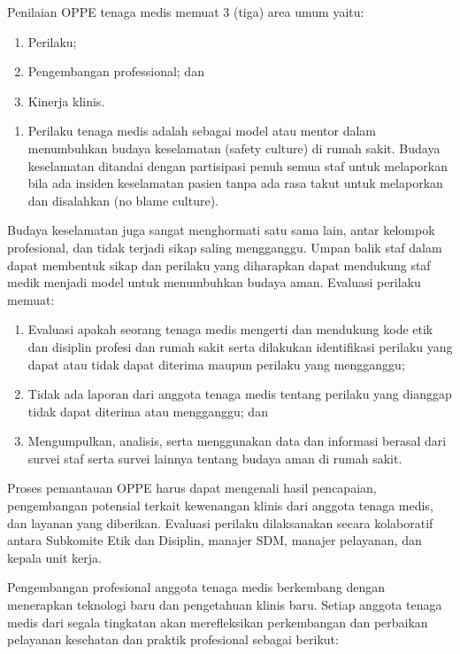 \documentclass[
]{book}
\providecommand{\tightlist}{%
  \setlength{\itemsep}{0pt}\setlength{\parskip}{0pt}}
\begin{document}
Penilaian OPPE tenaga medis memuat 3 (tiga) area umum yaitu:

\begin{enumerate}
\def\labelenumi{\arabic{enumi}.}
\tightlist
\item
  Perilaku;
\item
  Pengembangan professional; dan
\item
  Kinerja klinis.
\end{enumerate}

\begin{enumerate}
\def\labelenumi{\alph{enumi}.}
\setcounter{enumi}{1}
\tightlist
\item
  Perilaku tenaga medis adalah sebagai model atau mentor dalam menumbuhkan budaya keselamatan (safety culture) di rumah sakit. Budaya keselamatan ditandai dengan partisipasi penuh semua staf untuk melaporkan bila ada insiden keselamatan pasien tanpa ada rasa takut untuk melaporkan dan disalahkan (no blame culture).
\end{enumerate}

Budaya keselamatan juga sangat menghormati satu sama lain, antar kelompok profesional, dan tidak terjadi sikap saling mengganggu. Umpan balik staf dalam dapat membentuk sikap dan perilaku yang diharapkan dapat mendukung staf medik menjadi model untuk menumbuhkan budaya aman. Evaluasi perilaku memuat:

\begin{enumerate}
\def\labelenumi{\arabic{enumi}.}
\tightlist
\item
  Evaluasi apakah seorang tenaga medis mengerti dan mendukung kode etik dan disiplin profesi dan rumah sakit serta dilakukan identifikasi perilaku yang dapat atau tidak dapat diterima maupun perilaku yang mengganggu;
\item
  Tidak ada laporan dari anggota tenaga medis tentang perilaku yang dianggap tidak dapat diterima atau mengganggu; dan
\item
  Mengumpulkan, analisis, serta menggunakan data dan informasi berasal dari survei staf serta survei lainnya tentang budaya aman di rumah sakit.
\end{enumerate}

Proses pemantauan OPPE harus dapat mengenali hasil pencapaian, pengembangan potensial terkait kewenangan klinis dari anggota tenaga medis, dan layanan yang diberikan. Evaluasi perilaku dilaksanakan secara kolaboratif antara Subkomite Etik dan Disiplin, manajer SDM, manajer pelayanan, dan kepala unit kerja.

Pengembangan profesional anggota tenaga medis berkembang dengan menerapkan teknologi baru dan pengetahuan klinis baru. Setiap anggota tenaga medis dari segala tingkatan akan merefleksikan perkembangan dan perbaikan pelayanan kesehatan dan praktik profesional sebagai berikut:
\end{document}
